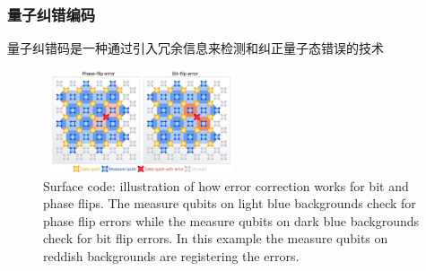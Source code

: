 \begin{frame}
    \frametitle{量子纠错编码}
        量子纠错码是一种通过引入冗余信息来检测和纠正量子态错误的技术\\
	{\fontsize{7.5pt}{5.2pt}\selectfont{当量子态受到干扰发生错误时，量子纠错码可以识别并恢复正确的量子态}}
    \begin{figure}
        \centering
                \includegraphics[height=1.2in, width=2.3in, viewport=0 0 1210 650,clip]{Figures/Quantum_Error-correction-diagram.jpg}
		\caption{\tiny{\textrm{Surface code: illustration of how error correction works for bit and phase flips. The measure qubits on light blue backgrounds check for phase flip errors while the measure qubits on dark blue backgrounds check for bit flip errors. In this example the measure qubits on reddish backgrounds are registering the errors.}}}
		\label{Fig:Quantum_Error-correction-diagram}
    \end{figure}
       	    \vskip -10pt
	    {\fontsize{7.5pt}{5.2pt}\selectfont{表面编码是一种常用的量子纠错码，在量子计算中可有效提高量子态的保持时间和计算的可靠性}}
\end{frame}

